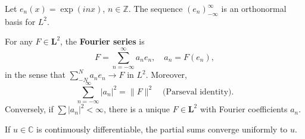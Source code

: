 Let $e_n(x) = \exp(inx)$, $n \in \mathbb{Z}$. The sequence $(e_n)_{-\infty}^{\infty}$ is an orthonormal basis for $L^2$.

For any $F \in \mathbf{L}^2$, the \textbf{Fourier series} is
$$F = \sum_{n=-\infty}^{\infty} a_n e_n, \quad a_n = F(e_n),$$
in the sense that $\sum_{-N}^{N} a_n e_n \to F$ in $L^2$. Moreover,
$$\sum_{n=-\infty}^{\infty} |a_n|^2 = \|F\|^2 \quad \text{(Parseval identity)}.$$
Conversely, if $\sum |a_n|^2 < \infty$, there is a unique $F \in \mathbf{L}^2$ with Fourier coefficients $a_n$.

If $u \in \mathbb{C}$ is continuously differentiable, the partial sums converge uniformly to $u$.
